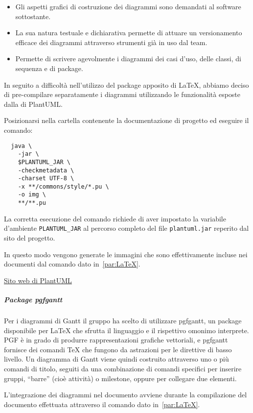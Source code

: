 \documentclass[../../norme-di-progetto.tex]{subfiles}
\begin{document}
\begin{itemize}
  \item Gli aspetti grafici di costruzione dei diagrammi sono demandati al software sottostante.
  \item La sua natura testuale e dichiarativa permette di attuare un versionamento efficace dei diagrammi attraverso strumenti già in uso dal team.
  \item Permette di scrivere agevolmente i diagrammi dei casi d'uso, delle classi, di sequenza e di package.
\end{itemize}

In seguito a difficoltà nell'utilizzo del package apposito di \LaTeX{}, abbiamo deciso di pre-compilare separatamente i diagrammi utilizzando le funzionalità esposte dalla  di PlantUML\@.

Posizionarsi nella cartella contenente la documentazione di progetto ed eseguire il comando:

\begin{verbatim}
  java \
    -jar \
    $PLANTUML_JAR \
    -checkmetadata \
    -charset UTF-8 \
    -x **/commons/style/*.pu \
    -o img \
    **/**.pu
\end{verbatim}

La corretta esecuzione del comando richiede di aver impostato la variabile d'ambiente \verb|PLANTUML_JAR| al percorso completo del file \verb|plantuml.jar| reperito dal sito del progetto.

In questo modo vengono generate le immagini che sono effettivamente incluse nei documenti dal comando dato in~\ref{par:LaTeX}.

\href{https://plantuml.com/}{Sito web di PlantUML}

\subparagraph{Package pgfgantt}%
\label{subp:pgfgantt}

Per i diagrammi di Gantt il gruppo ha scelto di utilizzare pgfgantt, un package disponibile per \LaTeX{} che sfrutta il linguaggio  e il rispettivo omonimo interprete.
PGF è in grado di produrre rappresentazioni grafiche vettoriali, e pgfgantt fornisce dei comandi \TeX{} che fungono da astrazioni per le direttive di basso livello.
Un diagramma di Gantt viene quindi costruito attraverso uno o più comandi di titolo, seguiti da una combinazione di comandi specifici per inserire gruppi, ``barre'' (cioè attività) o milestone, oppure per collegare due elementi.

L'integrazione dei diagrammi nel documento avviene durante la compilazione del documento effettuata attraverso il comando dato in~\ref{par:LaTeX}.
\end{document}
